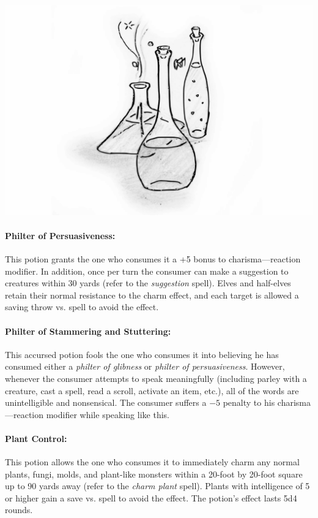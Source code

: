 \begin{multicols}{2}
\noindent\includegraphics[width=\columnwidth]{vials.pdf}\label{vials}

\paragraph{Philter of Persuasiveness:} This potion grants the one who consumes it a +5 bonus to charisma---reaction modifier.  In addition, once per turn the consumer can make a suggestion to creatures within 30 yards (refer to the \textit{suggestion} spell).  Elves and half-elves retain their normal resistance to the charm effect, and each target is allowed a saving throw vs. spell to avoid the effect.

\paragraph{Philter of Stammering and Stuttering:} This accursed potion fools the one who consumes it into believing he has consumed either a \textit{philter of glibness} or \textit{philter of persuasiveness}.  However, whenever the consumer attempts to speak meaningfully (including parley with a creature, cast a spell, read a scroll, activate an item, etc.), all of the words are unintelligible and nonsensical.  The consumer suffers a $-5$ penalty to his charisma---reaction modifier while speaking like this.

\paragraph{Plant Control:} This potion allows the one who consumes it to immediately charm any normal plants, fungi, molds, and plant-like monsters within a 20-foot by 20-foot square up to 90 yards away (refer to the \textit{charm plant} spell).  Plants with intelligence of 5 or higher gain a save vs. spell to avoid the effect.  The potion's effect lasts 5d4 rounds.


\end{multicols}
